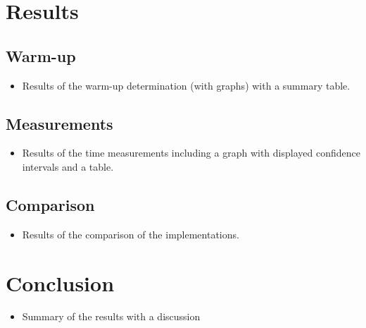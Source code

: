 \documentclass[onecolumn, conference]{IEEEtran}
\newcommand{\conciseItem}{\itemsep1pt \parskip0pt \parsep0pt}
\begin{document}
\section{Results}
\subsection{Warm-up}
\begin{itemize}
	\conciseItem
	\item Results of the warm-up determination (with graphs) with a summary table.
\end{itemize}
\subsection{Measurements}
\begin{itemize}
	\conciseItem
	\item Results of the time measurements including a graph with displayed confidence intervals and a table.
\end{itemize}
\subsection{Comparison}
\begin{itemize}
	\conciseItem
	\item Results of the comparison of the implementations.
\end{itemize}


\section{Conclusion}
\begin{itemize}
	\conciseItem
	\item Summary of the results with a discussion
\end{itemize}
\end{document}
